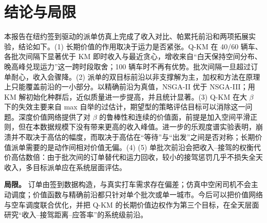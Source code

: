 \section{结论与局限}

本报告在纽约签到驱动的派单仿真上完成了收入对比、帕累托前沿和两项拓展实验，结论如下。(1) 长期价值的作用取决于运力是否紧张。Q-KM 在 40/60 辆车、各批次间隔下显著优于 KM 即时收入与最近贪心，增收来自“白天保持空间分布、晚高峰兑现运力”这一跨时段取舍；100 辆车时不再有优势。批次间隔一旦超过订单耐心，收入会骤降。(2) 派单的双目标前沿以非支撑解为主，加权和方法在原理上只能覆盖前沿的一小部分。以精确前沿为真值，NSGA-II 优于 NSGA-III；用 KM 解初始化种群后，近似质量进一步提高，并且统计显著。(3) Q-KM 在大 $\beta$ 下的失效主要来自 max 自举的过估计，期望型的策略评估目标可以消除这一问题。深度价值网络提供了对 $\beta$ 的鲁棒性和连续的价值面，前提是加入空间平滑正则，但在本数据规模下没有带来更高的收入峰值。进一步的乐观度谱实验表明，崩溃并不取决于高估的幅度，而取决于高估在“等待”与“出发”之间是否对称；长期价值派单需要的是动作间相对价值无偏。(4) \HINDSIGHTCONC (5) 单批次前沿会把收入–接驾的权衡代价高估数倍：由于批次间的订单替代和运力回收，较小的接驾惩罚几乎不损失全天收入，多目标派单应在系统层面评估。

\textbf{局限。} 订单由签到数据构造，与真实打车需求存在偏差；仿真中空闲司机不会主动调度；价值函数与精确前沿都只针对单个批次或单一城市。今后可以把价值网络与空车调度联合优化，并把 Q-KM 的长期价值边权作为第三个目标，在全天层面研究“收入–接驾距离–应答率”的系统级前沿。
